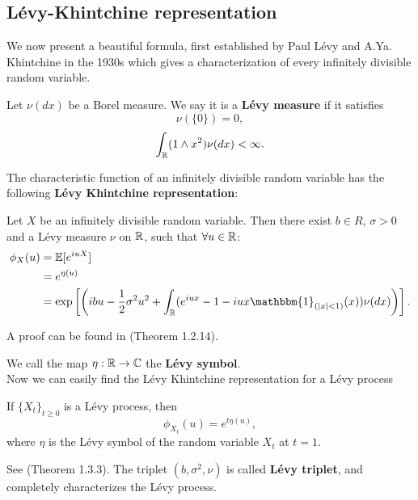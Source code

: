 \subsection{Lévy-Khintchine representation}

We now present a beautiful formula, first established by Paul Lévy and A.Ya. Khintchine in the 1930s
which gives a characterization of every infinitely divisible random variable.\\

\begin{Definition} \label{Levy_measure}
Let $\nu(dx)$ be a Borel measure. We say it is a \textbf{Lévy measure} if it satisfies
\begin{equation}
 \nu (\{ 0 \} ) = 0,
\end{equation}
\begin{equation} \label{Levy_m}
 \int_{\mathbb{R}} (1\wedge x^2) \nu(dx) < \infty.
\end{equation}
\end{Definition}
The characteristic function of an infinitely divisible random variable has the following \textbf{Lévy Khintchine representation}:
\begin{Theorem}
 Let $X$ be an infinitely divisible random variable. Then there exist $b\in R$, $\sigma>0$
 and a Lévy measure $\nu$ on $\mathbb{R}$, such that $\forall u \in \mathbb{R}$:
\begin{align}
\phi_X(u)  &= \mathbb{E} [e^{iuX}]  \\ 
	   &= e^{\eta(u)} \nonumber \\
	   &= \exp \left[ \left( ibu - \frac{1}{2}\sigma^2u^2 + \int_{\mathbb{R}} 
	   ( e^{iux} -1 -iux \mathbbm{1}_{(|x|<1)}(x) ) \nu(dx) \right) \right]. \nonumber		      
\end{align}
\end{Theorem}
A proof can be found in \cite{Applebaum} (Theorem 1.2.14).

We call the map $\eta : \mathbb{R} \to \mathbb{C}$ the \textbf{Lévy symbol}.\\

Now we can easily find the Lévy Khintchine representation for a Lévy process
\begin{Theorem}
 If $\{X_t\}_{t \ge 0}$ is a Lévy process, then
 \begin{equation}\label{Levy_Kint}
  \phi_{X_t}(u) = e^{t \eta(u)},
 \end{equation}
where $\eta$ is the Lévy symbol of the random variable $X_t$ at $t=1$.
\end{Theorem}
See \cite{Applebaum} (Theorem 1.3.3).
The triplet $(b,\sigma^2,\nu)$ is called \textbf{Lévy triplet}, and completely characterizes the Lévy process.

